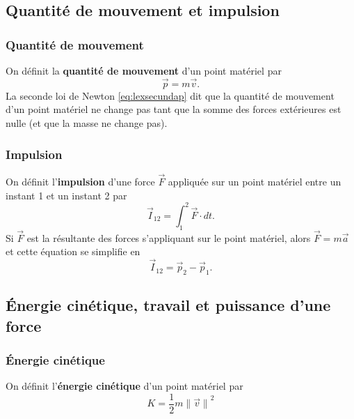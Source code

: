 \documentclass{article}
\providecommand{\norm}[1]{{\lVert#1\rVert}}
\begin{document}
\subsection{Quantité de mouvement et impulsion}
\subsubsection{Quantité de mouvement}
On définit la \textbf{quantité de mouvement} d'un point matériel par
\begin{equation}
	\boxed{\vec p = m \vec v.}
\end{equation}
La seconde loi de Newton \eqref{eq:lexsecundap} dit que la quantité de mouvement d'un point matériel ne change pas tant que la somme des forces extérieures est nulle (et que la masse ne change pas).

\subsubsection{Impulsion}
On définit l'\textbf{impulsion} d'une force $\vec F$ appliquée sur un point matériel entre un instant 1 et un instant 2 par
\begin{equation}
	\vec I_{12} = \int_1^2 \vec F \cdot dt.
\end{equation}
Si $\vec F$ est la résultante des forces s'appliquant sur le point matériel, alors $\vec F = m \vec a$ et cette équation se simplifie en
\begin{equation}
	\boxed{\vec I_{12} = \vec p_2 - \vec p_1.}
\end{equation}

\subsection{Énergie cinétique, travail et puissance d'une force}
\subsubsection{Énergie cinétique}
On définit  l'\textbf{énergie cinétique} d'un point matériel par
\begin{equation}
	\boxed{K = \frac12 m \norm{\vec v}^2}
\end{equation}
\end{document}
